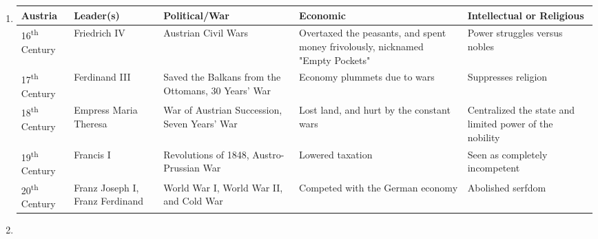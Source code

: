 \documentclass[12pt]{article}
\begin{document}
\begin{enumerate}
\begin{tabular}{p{} p{} p{} p{} p{}}
\end{tabular}

\item \begin{tabular}{p{} p{} p{} p{} p{}}

Austria & Leader(s) & Political/War & Economic & Intellectual or Religious \\
\hline
16\textsuperscript{th} Century & Friedrich IV & Austrian Civil Wars & Overtaxed the peasants, and spent money frivolously, nicknamed "Empty Pockets" & Power struggles versus nobles  \\
\hline
17\textsuperscript{th} Century & Ferdinand III  & Saved the Balkans from the Ottomans, 30 Years' War & Economy plummets due to wars & Suppresses religion  \\
\hline
18\textsuperscript{th} Century & Empress Maria Theresa & War of Austrian Succession, Seven Years' War & Lost land, and hurt by the constant wars & Centralized the state and limited power of the nobility \\
\hline
19\textsuperscript{th} Century & Francis I & Revolutions of 1848, Austro-Prussian War & Lowered taxation & Seen as completely incompetent \\
\hline
20\textsuperscript{th} Century & Franz Joseph I, Franz Ferdinand & World War I, World War II, and Cold War & Competed with the German economy & Abolished serfdom \\

\end{tabular}

\item \begin{tabular}{p{} p{} p{} p{} p{}}


\end{tabular}
\end{enumerate}
\end{document}
